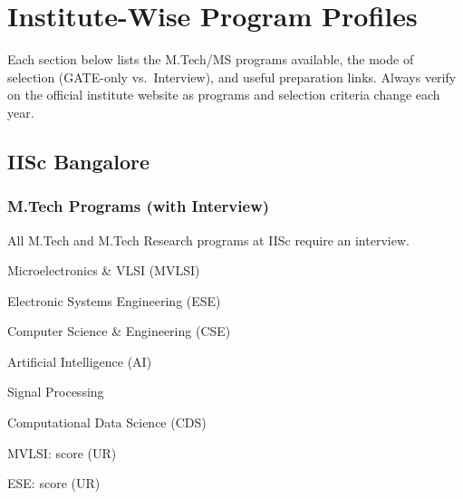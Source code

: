 
\chapter{Institute-Wise Program Profiles}
\label{chap:institutes}

\begin{protip}
  Each section below lists the M.Tech/MS programs available, the mode of
  selection (GATE-only vs.\ Interview), and useful preparation links.
  Always verify on the official institute website as programs and selection
  criteria change each year.
\end{protip}

\section{IISc Bangalore}
\label{sec:iisc}

\subsection*{M.Tech Programs (with Interview)}

All M.Tech and M.Tech Research programs at IISc require an interview.

\begin{pfChecklist}
  \item Microelectronics \& VLSI (MVLSI)
  \item Electronic Systems Engineering (ESE)
  \item Computer Science \& Engineering (CSE)
  \item Artificial Intelligence (AI)
  \item Signal Processing
  \item Computational Data Science (CDS)
\end{pfChecklist}

\begin{eligalert}
  \begin{pfChecklist}
    \item MVLSI:  \GATE score (UR)
    \item ESE:  \GATE score (UR)
  \end{pfChecklist}
\end{eligalert}

